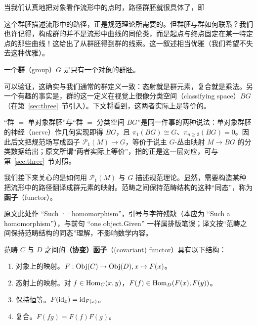 当我们认真地把对象看作流形中的点时，路径群胚就很具体了，即

\begin{center}
\end{center}

这个群胚描述流形中的路径，正是规范理论所需要的。但群胚与群如何联系？我们也许记得，构成群的并不是流形中曲线的同伦类，而是起点与终点固定在某一特定点的那些曲线！这给出了从群胚得到群的线索。这一叙述相当优雅（我们希望不失去这种优雅）。

\begin{definition}
一个\textbf{群}（group）$G$ 是只有一个对象的群胚。
\end{definition}

可以验证，这确实与我们通常的群定义一致：态射就是群元素，复合就是乘法。另一个有趣的事实是，群的这一定义在视觉上很像分类空间（classifying space）$BG$（在第~\ref{sec:three}~节引入）。下文将看到，这两者实际上是等价的。

\begin{yizhu}
“群 $=$ 单对象群胚”与“群 $=$ 分类空间 $BG$”是同一件事的两种说法：单对象群胚的神经（nerve）作几何实现即得 $BG$，且 $\pi_1(BG)\cong G$、$\pi_{n\ge2}(BG)=0$。因此后文把规范场写成函子 $\mathcal{P}_1(M)\to G$，等价于说主 $G$-丛由映射 $M\to BG$ 的分类数据给出；原文所谓“两者实际上等价”，指的正是这一层对应，可与第~\ref{sec:three}~节对照。
\end{yizhu}

我们接下来关心的是如何用 $\mathcal{P}_1(M)$ 与 $G$ 描述规范理论。显然，需要构造某种把流形中的路径翻译成群元素的映射。范畴之间保持范畴结构的这种“同态”，称为\textbf{函子}（functor）。

\begin{yizhu}[原文疑误]
原文此处作 “Such ··homomorphism”，引号与字符残缺（本应为 “Such a homomorphism”），与前句 “one object.Given” 一样属排版笔误；译文按“范畴之间保持范畴结构的同态”理解，不影响数学内容。
\end{yizhu}

\begin{definition}
范畴 $C$ 与 $D$ 之间的\textbf{（协变）函子}（(covariant) functor）具有以下结构：
\begin{enumerate}
    \item 对象上的映射。$F:{\rm Obj}(C)\to {\rm Obj}(D), x\mapsto F(x)$。
    \item 态射上的映射。对 $f\in {\rm Hom}_C(x,y)$，$F(f)\in {\rm Hom}_D(F(x),F(y))$。
    \item 保持恒等。$F({\rm id}_x) = {\rm id}_{F(x)}$。
    \item 复合。$F(fg) = F(f)F(g)$。
\end{enumerate}
\end{definition}


